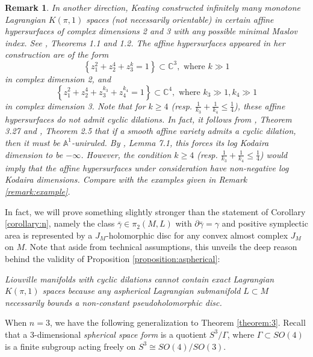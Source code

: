 \documentclass[a4paper]{article}
\newtheorem{remark}[theorem]{Remark}
\numberwithin{equation}{section}
\begin{document}
\begin{remark}
In another direction, Keating constructed infinitely many monotone Lagrangian $K(\pi,1)$ spaces (not necessarily orientable) in certain affine hypersurfaces of complex dimensions 2 and 3 with any possible minimal Maslov index. See \cite{ak3}, Theorems 1.1 and 1.2. The affine hypersurfaces appeared in her construction are of the form
\begin{equation}
\left\{z_1^2+z_2^4+z_3^k=1\right\}\subset\mathbb{C}^3,\textrm{ where }k\gg1
\end{equation}
in complex dimension 2, and
\begin{equation}
\left\{z_1^2+z_2^4+z_3^{k_3}+z_4^{k_4}=1\right\}\subset\mathbb{C}^4,\textrm{ where }k_3\gg1,k_4\gg1
\end{equation}
in complex dimension 3. Note that for $k\geq4$ (resp. $\frac{1}{k_3}+\frac{1}{k_4}\leq\frac{1}{4}$), these affine hypersurfaces do not admit cyclic dilations. In fact, it follows from \cite{zz2}, Theorem 3.27 and \cite{mm}, Theorem 2.5 that if a smooth affine variety admits a cyclic dilation, then it must be $\mathbb{A}^1$-uniruled. By \cite{mm}, Lemma 7.1, this forces its log Kodaira dimension to be $-\infty$. However, the condition $k\geq4$ (resp. $\frac{1}{k_3}+\frac{1}{k_4}\leq\frac{1}{4}$) would imply that the affine hypersurfaces under consideration have non-negative log Kodaira dimensions. Compare with the examples given in Remark \ref{remark:example}.
\end{remark}

In fact, we will prove something slightly stronger than the statement of Corollary \ref{corollary:n}, namely the class $\bar{\gamma}\in\pi_2(M,L)$ with $\partial\bar{\gamma}=\gamma$ and positive symplectic area is represented by a $J_M$-holomorphic disc for any convex almost complex $J_M$ on $M$. Note that aside from technical assumptions, this unveils the deep reason behind the validity of Proposition \ref{proposition:aspherical}: 

\textit{Liouville manifolds with cyclic dilations cannot contain exact Lagrangian $K(\pi,1)$ spaces because any aspherical Lagrangian submanifold $L\subset M$ necessarily bounds a non-constant pseudoholomorphic disc.}

When $n=3$, we have the following generalization to Theorem \ref{theorem:3}. Recall that a 3-dimensional \textit{spherical space form} is a quotient $S^3/\Gamma$, where $\Gamma\subset\mathit{SO}(4)$ is a finite subgroup acting freely on $S^3\cong\mathit{SO}(4)/\mathit{SO}(3)$.
\end{document}
